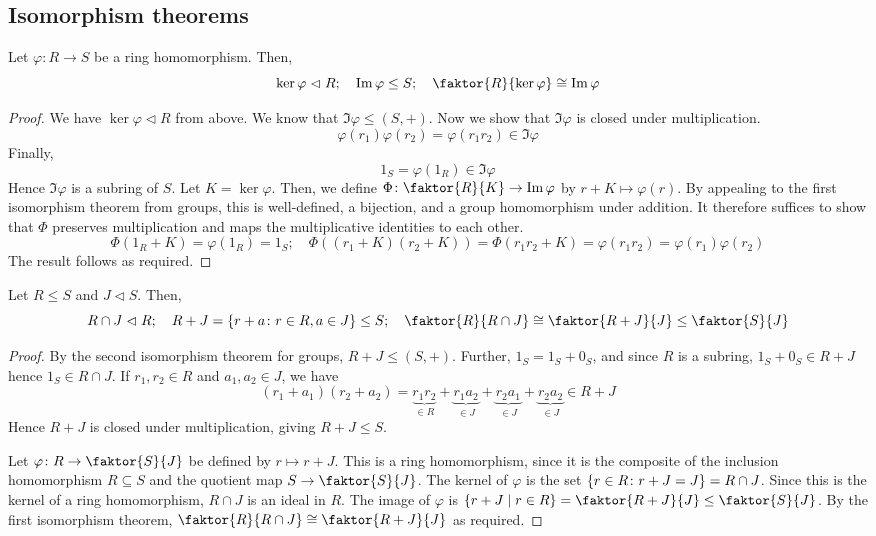 \subsection{Isomorphism theorems}
\begin{theorem}
	Let \( \varphi \colon R \to S \) be a ring homomorphism.
	Then,
	\[
		\ker \varphi \vartriangleleft R;\quad \Im \varphi \leq S;\quad \faktor{R}{\ker \varphi} \cong \Im \varphi
	\]
\end{theorem}
\begin{proof}
	We have \( \ker \varphi \vartriangleleft R \) from above.
	We know that \( \Im \varphi \leq (S, +) \).
	Now we show that \( \Im \varphi \) is closed under multiplication.
	\[
		\varphi(r_1) \varphi(r_2) = \varphi(r_1 r_2) \in \Im \varphi
	\]
	Finally,
	\[
		1_S = \varphi(1_R) \in \Im \varphi
	\]
	Hence \( \Im \varphi \) is a subring of \( S \).
	Let \( K = \ker \varphi \).
	Then, we define \( \Phi \colon \faktor{R}{K} \to \Im \varphi \) by \( r+K \mapsto \varphi(r) \).
	By appealing to the first isomorphism theorem from groups, this is well-defined, a bijection, and a group homomorphism under addition.
	It therefore suffices to show that \( \Phi \) preserves multiplication and maps the multiplicative identities to each other.
	\[
		\Phi(1_R + K) = \varphi(1_R) = 1_S;\quad \Phi((r_1+K)(r_2+K)) = \Phi(r_1 r_2 +K) = \varphi(r_1 r_2) = \varphi(r_1) \varphi(r_2)
	\]
	The result follows as required.
\end{proof}
\begin{theorem}
	Let \( R \leq S \) and \( J \vartriangleleft S \).
	Then,
	\[
		R \cap J \vartriangleleft R;\quad R + J = \qty{r+a \colon r\in R, a \in J} \leq S;\quad \faktor{R}{R \cap J} \cong \faktor{R+J}{J} \leq \faktor{S}{J}
	\]
\end{theorem}
\begin{proof}
	By the second isomorphism theorem for groups, \( R+J \leq (S, +) \).
	Further, \( 1_S = 1_S + 0_S \), and since \( R \) is a subring, \( 1_S + 0_S \in R + J \) hence \( 1_S \in R \cap J \).
	If \( r_1, r_2 \in R \) and \( a_1, a_2 \in J \), we have
	\[
		(r_1 + a_1)(r_2 + a_2) = \underbrace{r_1 r_2}_{\in R} + \underbrace{r_1 a_2}_{\in J} + \underbrace{r_2 a_1}_{\in J} + \underbrace{r_2 a_2}_{\in J} \in R + J
	\]
	Hence \( R+J \) is closed under multiplication, giving \( R+J \leq S \).

	Let \( \varphi \colon R \to \faktor{S}{J} \) be defined by \( r \mapsto r + J \).
	This is a ring homomorphism, since it is the composite of the inclusion homomorphism \( R \subseteq S \) and the quotient map \( S \to \faktor{S}{J} \).
	The kernel of \( \varphi \) is the set \( \qty{r \in R \colon r+J = J} = R \cap J \).
	Since this is the kernel of a ring homomorphism, \( R \cap J \) is an ideal in \( R \).
	The image of \( \varphi \) is \( \qty{r+J \mid r \in R} = \faktor{R+J}{J} \leq \faktor{S}{J} \).
	By the first isomorphism theorem, \( \faktor{R}{R \cap J} \cong \faktor{R+J}{J} \) as required.
\end{proof}
